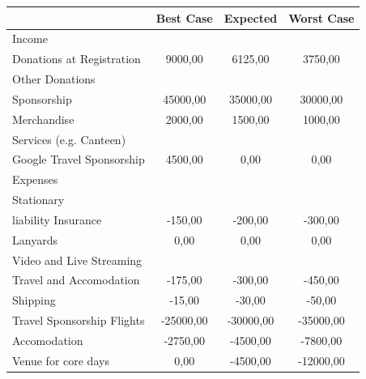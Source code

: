 \documentclass[parskip=half,final,oneside,a4paper,pdftex]{scrartcl}
\begin{document}
\begin{tabularx}{\linewidth}{XSSS}
   & {Best Case} & {Expected} & {Worst Case} \\
  \hline\hline
Income \hspace*{1em}  &  &  &  \\
\hspace*{1em} Donations at Registration  & 9000,00 & 6125,00 & 3750,00 \\
\hspace*{1em} Other Donations  &  &  &  \\
\hspace*{1em} Sponsorship  & 45000,00 & 35000,00 & 30000,00 \\
\hspace*{1em} Merchandise  & 2000,00 & 1500,00 & 1000,00 \\
\hspace*{1em} Services (e.g. Canteen)  &  &  &  \\
\hspace*{1em} Google Travel Sponsorship  & 4500,00 & 0,00 & 0,00 \\[1ex]
Expenses \hspace*{1em}  &  &  &  \\
\hspace*{1em} Stationary  &  &  &  \\
\hspace*{1em} liability Insurance  & -150,00 & -200,00 & -300,00 \\
\hspace*{1em} Lanyards  & 0,00 & 0,00 & 0,00 \\
\hspace*{1em} Video and Live Streaming  &  &  &  \\
\hspace*{1em} \hspace*{1em} Travel and Accomodation & -175,00 & -300,00 & -450,00 \\
\hspace*{1em} \hspace*{1em} Shipping & -15,00 & -30,00 & -50,00 \\
\hspace*{1em} Travel Sponsorship Flights & -25000,00 & -30000,00 & -35000,00 \\
\hspace*{1em} \hspace*{1em} Accomodation & -2750,00 & -4500,00 & -7800,00 \\
\hspace*{1em} Venue for core days  & 0,00 & -4500,00 & -12000,00 \\

\end{tabularx}
\end{document}
